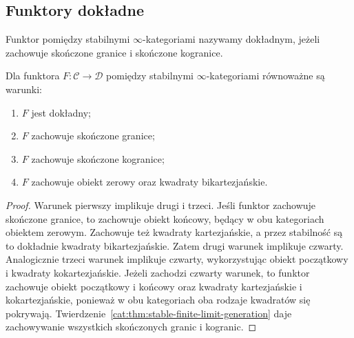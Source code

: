 \subsection{Funktory dokładne}

\begin{definicja}\label{cat:def:stable-exact-functor}
Funktor pomiędzy stabilnymi $\infty$-kategoriami nazywamy dokładnym, jeżeli zachowuje skończone granice i skończone kogranice.
\end{definicja}

\begin{stwierdzenie}\label{cat:prop:stable-exact-criteria}
Dla funktora $F:\mathcal C\to\mathcal D$ pomiędzy stabilnymi $\infty$-kategoriami równoważne są warunki:
\begin{enumerate}
 \item $F$ jest dokładny;
 \item $F$ zachowuje skończone granice;
 \item $F$ zachowuje skończone kogranice;
 \item $F$ zachowuje obiekt zerowy oraz kwadraty bikartezjańskie.
\end{enumerate}
\end{stwierdzenie}
\begin{proof}
Warunek pierwszy implikuje drugi i trzeci. Jeśli funktor zachowuje skończone granice, to zachowuje obiekt końcowy, będący w obu kategoriach obiektem zerowym. Zachowuje też kwadraty kartezjańskie, a przez stabilność są to dokładnie kwadraty bikartezjańskie. Zatem drugi warunek implikuje czwarty. Analogicznie trzeci warunek implikuje czwarty, wykorzystując obiekt początkowy i kwadraty kokartezjańskie. Jeżeli zachodzi czwarty warunek, to funktor zachowuje obiekt początkowy i końcowy oraz kwadraty kartezjańskie i kokartezjańskie, ponieważ w obu kategoriach oba rodzaje kwadratów się pokrywają. Twierdzenie~\ref{cat:thm:stable-finite-limit-generation} daje zachowywanie wszystkich skończonych granic i kogranic.
\end{proof}

